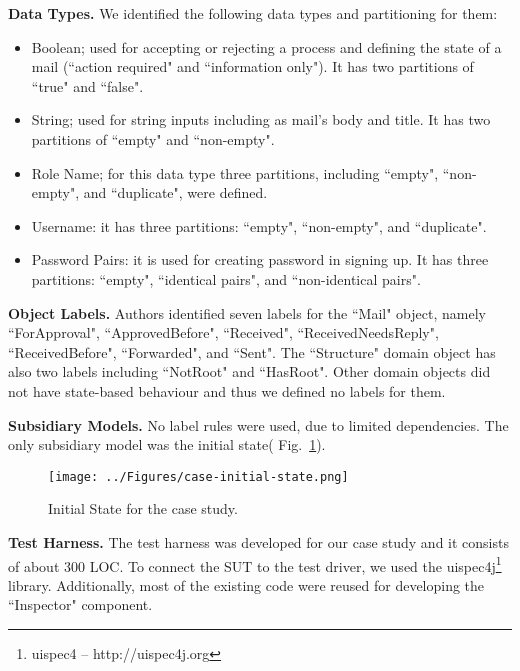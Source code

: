 \textbf{Data Types.}  We identified the following data types and partitioning for them:
\begin{itemize}
	\item Boolean;  used for accepting or rejecting a process and defining the state of a mail (``action required" and ``information only"). It has two partitions of ``true" and ``false".
	
	\item String; used for string inputs including as mail's body and title. It has two partitions of ``empty" and ``non-empty". 
	
	\item Role Name; for this data type three partitions, including ``empty", ``non-empty", and ``duplicate",  were defined.
	
	\item Username: it has three partitions: ``empty", ``non-empty", and ``duplicate".
	
	\item Password Pairs: it is used for creating password in signing up. It has three partitions: ``empty", ``identical pairs", and ``non-identical pairs".
\end{itemize}

 \textbf{Object Labels.} Authors identified seven labels for the ``Mail" object, namely ``ForApproval", ``ApprovedBefore", ``Received", ``ReceivedNeedsReply", ``ReceivedBefore", ``Forwarded", and ``Sent". The ``Structure" domain object has also two labels including ``NotRoot" and ``HasRoot". Other domain objects did not have state-based behaviour and thus we defined no labels for them.

\textbf{Subsidiary Models.} No label rules were used, due to limited dependencies. The only subsidiary model was the initial state( Fig.~\ref{fig:case-initial-state}).

\begin{figure}[h]
\centering
\texttt{[image: ../Figures/case-initial-state.png]}
\caption{Initial State for the case study.}
\label{fig:case-initial-state}
\end{figure}

\textbf{Test Harness.} The test harness was developed for our case study and it consists of about 300 LOC. To connect the SUT to the test driver, we used the uispec4j\footnote{ uispec4 – http://uispec4j.org} library. Additionally, most of the existing code were reused for developing the ``Inspector" component.
 
